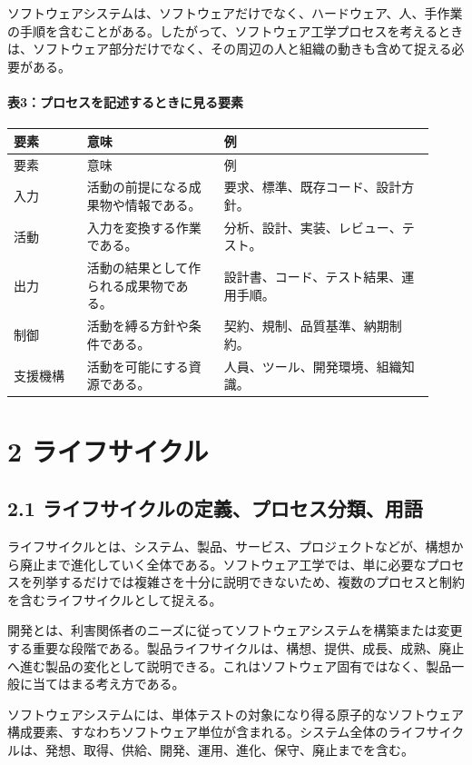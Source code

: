 \documentclass[uplatex,dvipdfmx,a4paper,11pt]{jsarticle}
\begin{document}
ソフトウェアシステムは、ソフトウェアだけでなく、ハードウェア、人、手作業の手順を含むことがある。したがって、ソフトウェア工学プロセスを考えるときは、ソフトウェア部分だけでなく、その周辺の人と組織の動きも含めて捉える必要がある。

\paragraph{表3：プロセスを記述するときに見る要素}
\begin{longtable}{>{\raggedright\arraybackslash}p{0.16\linewidth}>{\raggedright\arraybackslash}p{0.30\linewidth}>{\raggedright\arraybackslash}p{0.46\linewidth}}
\toprule
要素 & 意味 & 例\\
\midrule
\endfirsthead
\toprule
要素 & 意味 & 例\\
\midrule
\endhead
入力 & 活動の前提になる成果物や情報である。 & 要求、標準、既存コード、設計方針。\\
活動 & 入力を変換する作業である。 & 分析、設計、実装、レビュー、テスト。\\
出力 & 活動の結果として作られる成果物である。 & 設計書、コード、テスト結果、運用手順。\\
制御 & 活動を縛る方針や条件である。 & 契約、規制、品質基準、納期制約。\\
支援機構 & 活動を可能にする資源である。 & 人員、ツール、開発環境、組織知識。\\
\bottomrule
\end{longtable}
\section{2 ライフサイクル}
\subsection{2.1 ライフサイクルの定義、プロセス分類、用語}
ライフサイクルとは、システム、製品、サービス、プロジェクトなどが、構想から廃止まで進化していく全体である。ソフトウェア工学では、単に必要なプロセスを列挙するだけでは複雑さを十分に説明できないため、複数のプロセスと制約を含むライフサイクルとして捉える。

開発とは、利害関係者のニーズに従ってソフトウェアシステムを構築または変更する重要な段階である。製品ライフサイクルは、構想、提供、成長、成熟、廃止へ進む製品の変化として説明できる。これはソフトウェア固有ではなく、製品一般に当てはまる考え方である。

ソフトウェアシステムには、単体テストの対象になり得る原子的なソフトウェア構成要素、すなわちソフトウェア単位が含まれる。システム全体のライフサイクルは、発想、取得、供給、開発、運用、進化、保守、廃止までを含む。
\end{document}
